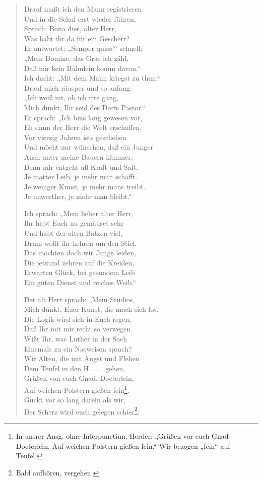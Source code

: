 \begin{verse}
Drauf mußt ich den Mann registrieren\\
Und in die Schul erst wieder führen.\\
Sprach: Bona dies, alter Herr,\\
Was habt ihr da für ein Gescherr?\\
Er antwortet: „Semper quies!“ schnell;\\
„Mein Domine, das Gras ich zähl,\\
Daß mir kein Hälmlein komm davon.“\\
Ich dacht: „Mit dem Mann kriegst zu thun.“\\
Drauf mich räusper und so anfang:\\
„Ich weiß nit, ob ich irre gang,\\
Mich dünkt, Ihr seid des Dorfs Pastor.“\\
Er sprach: „Ich bins lang gewesen vor,\\
Eh dann der Herr die Welt erschaffen.\\
Vor vierzig Jahren ists geschehen\\
Und möcht nur wünschen, daß ein Junger\\
Auch unter meine Bauern kämmer,\\
Denn mir entgeht all Kraft und Saft.\\
Je matter Leib, je mehr man schafft.\\
Je weniger Kunst, je mehr mans treibt.\\
Je unwerther, je mehr man bleibt.“

Ich sprach: „Mein lieber alter Herr,\\
Ihr habt Euch nu gemäuset sehr\\
Und habt der alten Batzen viel,\\
Drum wollt ihr kehren um den Stiel.\\
Das möchten doch wir Junge leiden,\\
Die jetzund zehren auf die Kreiden,\\
Erwarten Glück, bei gesundem Leib\\
Ein guten Dienst und reiches Weib.“

Der alt Herr sprach: „Mein Studios,\\
Mich dünkt, Euer Kunst, die mach sich los.\\
Die Logik wird sich in Euch regen,\\
Daß Ihr mit mir recht so verwegen.\\
Wißt Ihr, was Luther in der Sach\\
Einsmals zu ein Nasweisen sprach?\\
Wir Alten, die mit Angst und Flehen\\
Dem Teufel in den H ...... gehen,\\
Grüßen von euch Gnad, Docterlein,\\
Auf weichen Polstern gießen fein\footnote{In unsrer Ausg. ohne Interpunctiun. Herder: „Grüßen vor euch Gnad-Docterlein. Auf weichen Polstern gießen fein.“ Wir bezogen „fein“ auf Teufel.}.\\
Guckt vor so lang darein als wir,\\
Der Scherz wird euch gelegen schier\footnote{Bald aufhören, vergehen.}.


\end{verse}

